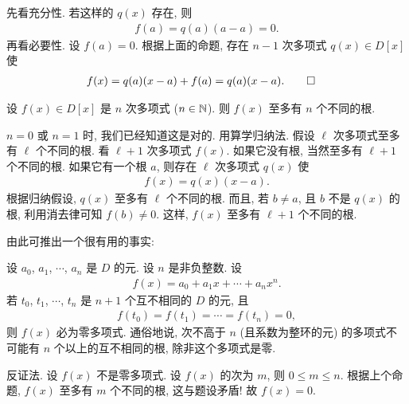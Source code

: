 \begin{pf}
    先看充分性. 若这样的 $q(x)$ 存在, 则
    \begin{align*}
        f(a) = q(a) (a-a) = 0.
    \end{align*}
    再看必要性. 设 $f(a)=0$. 根据上面的命题, 存在 $n-1$ 次多项式 $q(x) \in D[x]$ 使
    \begin{align*}
         & f(x) = q(a) (x-a) + f(a) = q(a) (x-a). \qedhere
    \end{align*}
\end{pf}

\begin{proposition}
    设 $f(x) \in D[x]$ 是 $n$ 次多项式 ($n \in \mathbb{N}$). 则 $f(x)$ 至多有 $n$ 个不同的根.
\end{proposition}

\begin{pf}
    $n = 0$ 或 $n = 1$ 时, 我们已经知道这是对的. 用算学归纳法. 假设 $\ell$ 次多项式至多有 $\ell$ 个不同的根. 看 $\ell + 1$ 次多项式 $f(x)$. 如果它没有根, 当然至多有 $\ell + 1$ 个不同的根. 如果它有一个根 $a$, 则存在 $\ell$ 次多项式 $q(x)$ 使
    \begin{align*}
        f(x) = q(x) (x-a).
    \end{align*}
    根据归纳假设, $q(x)$ 至多有 $\ell$ 个不同的根. 而且, 若 $b \neq a$, 且 $b$ 不是 $q(x)$ 的根, 利用消去律可知 $f(b) \neq 0$. 这样, $f(x)$ 至多有 $\ell + 1$ 个不同的根.
\end{pf}

由此可推出一个很有用的事实:

\begin{proposition}
    设 $a_0$, $a_1$, $\cdots$, $a_n$ 是 $D$ 的元. 设 $n$ 是非负整数. 设
    \begin{align*}
        f(x) = a_0 + a_1 x + \cdots + a_n x^n.
    \end{align*}
    若 $t_0$, $t_1$, $\cdots$, $t_n$ 是 $n+1$ 个互不相同的 $D$ 的元, 且
    \begin{align*}
        f(t_0) = f(t_1) = \cdots = f(t_n) = 0,
    \end{align*}
    则 $f(x)$ 必为零多项式. 通俗地说, 次不高于 $n$ (且系数为整环的元) 的多项式不可能有 $n$ 个以上的互不相同的根, 除非这个多项式是零.
\end{proposition}

\begin{pf}
    反证法. 设 $f(x)$ 不是零多项式. 设 $f(x)$ 的次为 $m$, 则 $0 \leq m \leq n$. 根据上个命题, $f(x)$ 至多有 $m$ 个不同的根, 这与题设矛盾! 故 $f(x) = 0$.
\end{pf}

